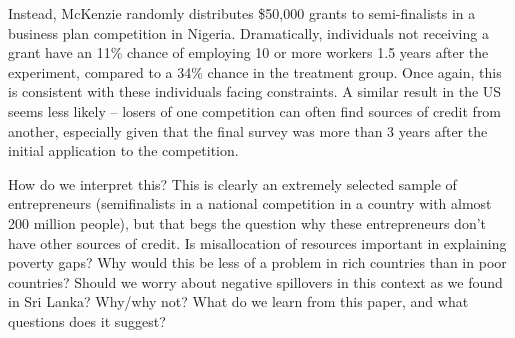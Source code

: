 \documentclass[12pt,english]{article}
\begin{document}
Instead, McKenzie randomly distributes \$50,000 grants to semi-finalists in a business plan competition in Nigeria. Dramatically, individuals not receiving a grant have an 11\% chance of employing 10 or more workers 1.5 years after the experiment, compared to a 34\% chance in the treatment group. Once again, this is consistent with these individuals facing constraints. A similar result in the US seems less likely -- losers of one competition can often find sources of credit from another, especially given that the final survey was more than 3 years after the initial application to the competition.

How do we interpret this? This is clearly an extremely selected sample of entrepreneurs (semifinalists in a national competition in a country with almost 200 million people), but that begs the question why these entrepreneurs don't have other sources of credit. Is misallocation of resources important in explaining poverty gaps? Why would this be less of a problem in rich countries than in poor countries? Should we worry about negative spillovers in this context as we found in Sri Lanka? Why/why not? What do we learn from this paper, and what questions does it suggest?
\end{document}
